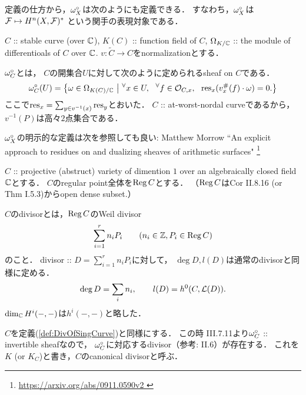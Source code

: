 \documentclass[a4paper]{jsarticle}
\begin{document}
    \begin{Remark}
        定義の仕方から，$\omega^{\circ}_X$は次のようにも定義できる．
        すなわち，$\omega^{\circ}_X$は$\mathcal{F} \mapsto H^n(X, \mathcal{F})^*$
        という関手の表現対象である．
    \end{Remark}

    \begin{Def}
        $C$ :: stable curve (over $\mathbb{C}$),
        $K(C)$ :: function field of $C$,
        $\Omega_{K/\mathbb{C}}$ :: the module of differentioals of $C$ over $\mathbb{C}$.
        $v: \tilde{C} \to C$をnormalizationとする．
        
        $\omega^{\circ}_C$とは，
        $C$の開集合$U$に対して次のように定められるsheaf on $C$である．
        \[
            \dualsh_C(U)=
            \left\{
                \omega \in \dermod_{K(C)/\C}
                \ \middle|\ 
                \Forall{x \in U} \Forall{f \in \shO_{C, x}} \res_x(v^{\#}_x(f) \cdot \omega)=0.
            \right\}
        \]
        ここで$\operatorname{res}_x=\sum_{y \in v^{-1}(x)} \operatorname{res}_y$とおいた．
        $C$ :: at-worst-nordal curveであるから，
        $v^{-1}(P)$は高々$2$点集合である．
    \end{Def}
    \begin{Remark}
        $\omega^{\circ}_X$の明示的な定義は次を参照しても良い:
        Matthew Morrow
        ``An explicit approach to residues on and dualizing sheaves of arithmetic surfaces"
        \footnote{\url{ https://arxiv.org/abs/0911.0590v2 }}
    \end{Remark}

    \begin{Def} \label{def:DivOfSingCurve}
        $C$ :: projective (abstruct) variety of dimention $1$
        over an algebraically closed field $\mathbb{C}$とする．
        $C$のregular point全体を$\operatorname{Reg} C$とする．
        （$\operatorname{Reg} C$はCor II.8.16 (or Thm I.5.3)からopen dense subset.）

        $C$のdivisorとは，$\operatorname{Reg} C$のWeil divisor
        \[ \sum_{i=1}^{r} n_i P_i \qquad (n_i \in \mathbb{Z}, P_i \in \operatorname{Reg} C) \]
        のこと．
        divisor :: $D=\sum_{i=1}^{r} n_i P_i$に対して，
        $\deg D, l(D)$は通常のdivisorと同様に定める．
        \[ \deg D=\sum_i n_i, \qquad l(D)=h^0(C, \mathcal{L}(D)). \]
        $\dim_{\mathbb{C}} H^i(-,-)$は$h^i(-,-)$と略した．
    \end{Def}

    \begin{Def}
        $C$を定義(\ref{def:DivOfSingCurve})と同様にする．
        この時\cite{HarAG} III.7.11より$\omega^{\circ}_C$ :: invertible sheafなので，
        $\omega^{\circ}_C$に対応するdivisor（参考: \cite{HarAG} II.6）が存在する．
        これを$K$ (or $K_C$)と書き，$C$のcanonical divisorと呼ぶ．
    \end{Def}
\end{document}
